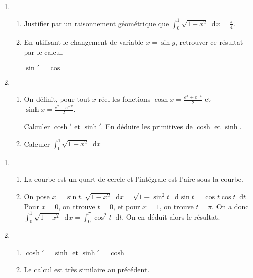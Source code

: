 \documentclass[11pt,a4paper,french]{article}
\newcommand{\diff}{\mathop{}\mathopen{}\mathrm{d}}
\theoremstyle{break}
\theoremstyle{plain}
\theoremstyle{nonumberplain}
\theoremstyle{nonumberbreak}
\begin{document}
\begin{question}~\\[-5mm]
  \begin{enumerate}
    \item \begin{enumerate}
        \item Justifier par un raisonnement géométrique que $\int_0^1
          \sqrt{1 - x^2} \diff x = \frac{\pi}4$.
        \item En utilisant le changement de variable $x = \sin y$,
          retrouver ce résultat par le calcul.

          \emph{$\sin' = \cos$}
      \end{enumerate}
    \item \begin{enumerate}
        \item On définit, pour tout $x$ réel les fonctions $\cosh x =
          \frac{e^x + e^{-x}}2$ et $\sinh x = \frac{e^x - e^{-x}}2$.

          Calculer $\cosh'$ et $\sinh'$. En déduire les primitives de
          $\cosh$ et $\sinh$.
        \item Calculer $\int_0^1 \sqrt{1 + x^2} \diff x$
      \end{enumerate}
  \end{enumerate}
\end{question}
\begin{solution}
  \begin{enumerate}
    \item
      \begin{enumerate}
        \item La courbe est un quart de cercle et l'intégrale est l'aire
          sous la courbe.
        \item On pose $x = \sin t$. $\sqrt{1 - x^2} \diff x = \sqrt{1 -
          \sin^2 t} \diff \sin t = \cos t \cos t \diff t $ Pour $x = 0$,
          on ttrouve $t = 0$, et pour $x = 1$, on trouve $t = \pi$. On a
          donc $\int_0^1 \sqrt{1 - x^2} \diff x = \int_0^{\pi} \cos^2 t
          \diff t$. On en déduit alors le résultat.
      \end{enumerate}
    \item
      \begin{enumerate}
        \item $\cosh' = \sinh$ et $\sinh' = \cosh$
        \item Le calcul est très similaire au précédent.
      \end{enumerate}
  \end{enumerate}
\end{solution}
\end{document}
